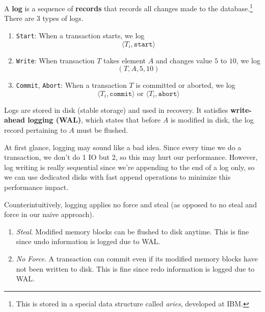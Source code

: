     \begin{definition}[Log]
      A \textbf{log} is a sequence of \textbf{records} that records all changes made to the database.\footnote{This is stored in a special data structure called \textit{aries}, developed at IBM.} There are 3 types of logs.
      \begin{enumerate}
        \item \texttt{Start}: When a transaction starts, we log 
          \begin{equation}
            \langle T_i, \texttt{start} \rangle
          \end{equation}
        \item \texttt{Write}: When transaction $T$ takes element $A$ and changes value $5$ to $10$, we log 
          \begin{equation}
            (T, A, 5, 10)
          \end{equation}
        \item \texttt{Commit}, \texttt{Abort}: When a transaction $T$ is committed or aborted, we log 
          \begin{equation}
            \langle T_i , \texttt{commit} \rangle \text{ or } \langle T_i , \texttt{abort} \rangle
          \end{equation}
      \end{enumerate}
      Logs are stored in disk (stable storage) and used in recovery. 
      It satisfies \textbf{write-ahead logging (WAL)}, which states that before $A$ is modified in disk, the log record pertaining to $A$ must be flushed. 
    \end{definition}

    At first glance, logging may sound like a bad idea. Since every time we do a transaction, we don't do 1 IO but 2, so this may hurt our performance. However, log writing is really sequential since we're appending to the end of a log only, so we can use dedicated disks with fast append operations to minimize this performance impact. 

    \begin{theorem}
      Counterintuitively, logging applies no force and steal (as opposed to no steal and force in our naive approach). 
      \begin{enumerate}
        \item \textit{Steal}. Modified memory blocks can be flushed to disk anytime. This is fine since undo information is logged due to WAL. 
        \item \textit{No Force}. A transaction can commit even if its modified memory blocks have not been written to disk. This is fine since redo information is logged due to WAL. 
      \end{enumerate}
    \end{theorem} 

